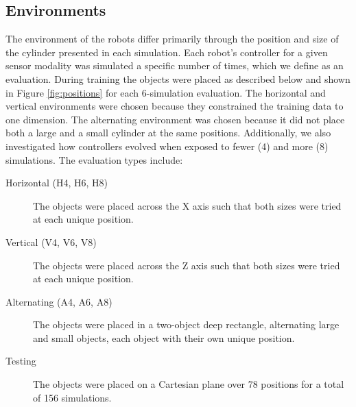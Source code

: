 \documentclass{sig-alternate}
\begin{document}
\subsection {Environments}

The environment of the robots differ primarily through the position and size of the cylinder presented in each simulation. Each robot's controller for a given sensor modality was simulated a specific number of times, which we define as an evaluation. During training the objects were placed as described below and shown in Figure \ref{fig:positions} for each 6-simulation evaluation. The horizontal and vertical environments were chosen because they constrained the training data to one dimension. The alternating environment was chosen because it did not place both a large and a small cylinder at the same positions. Additionally, we also investigated how controllers evolved when exposed to fewer (4) and more (8) simulations. The evaluation types include:

\begin{description}
\item[Horizontal (H4, H6, H8)] The objects were placed across the X axis such that both sizes were tried at each unique position.
\item[Vertical (V4, V6, V8)] The objects were placed across the Z axis such that both sizes were tried at each unique position.
\item[Alternating (A4, A6, A8)] The objects were placed in a two-object deep rectangle, alternating large and small objects, each object with their own unique position.
\item[Testing] The objects were placed on a Cartesian plane over 78 positions for a total of 156 simulations. 
\end{description}

\begin{figure*}[!t]
  \centering
  \vspace{-1cm} 
  \caption{ \label{fig:positions} This figure depicts the initial positions for the cylinders under various environments. Additionally, the thick red lines indicate the initial position of the robot's limbs. The filled circles represent the locations of the joints. The circle and ray colors correspond to the ordered pairs of sensors combined during the ontological scaffolding: the teal outer joint on the right arm corresponds to the rightmost eye's rays.}
  \vspace{-0.3cm} 
\end{figure*}
\end{document}
